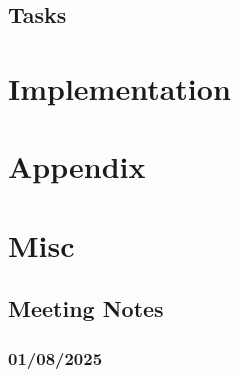 \documentclass{article}
\begin{document}
\subsection{Tasks}



\section{Implementation}







\section*{Appendix}

\section{Misc}

\subsection{Meeting Notes}

\subsubsection{01/08/2025}    
\end{document}
